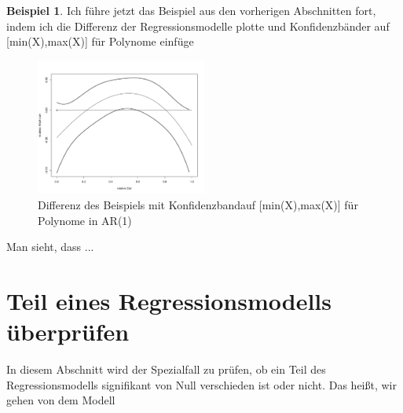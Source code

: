 \documentclass[12pt,a4paper]{article}
\theoremstyle{definition}
\newtheorem{Beispiel}[Definition]{Beispiel}
\theoremstyle{definition}
\theoremstyle{definition}
\begin{document}
\begin{Beispiel}
Ich führe jetzt das Beispiel aus den vorherigen Abschnitten fort, indem ich die Differenz der Regressionsmodelle plotte und Konfidenzbänder auf [min(X),max(X)] für Polynome einfüge

\begin{figure}[H] 
  \centering
     \includegraphics[width=0.5\textwidth]{Bsp-KB-poly-hetero}
  \caption{Differenz des Beispiels mit Konfidenzbandauf [min(X),max(X)] für Polynome in AR(1)}
  \label{KB-poly-hetero-BSP}
\end{figure}

Man sieht, dass ...

\end{Beispiel}


%
%


\newpage
\section{Teil eines Regressionsmodells überprüfen}
\label{Teil eines Regressionsmodells überprüfen}
In diesem Abschnitt wird der Spezialfall zu prüfen, ob ein Teil des Regressionsmodells signifikant von Null verschieden ist oder nicht.  Das heißt, wir gehen von dem Modell
\end{document}
